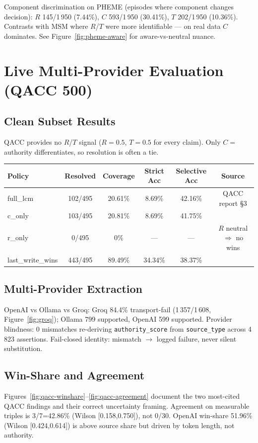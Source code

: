 \documentclass[12pt,a4paper]{article}
\begin{document}
Component discrimination on PHEME (episodes where component changes decision): $R$ 145/1\,950 (7.44\%), $C$ 593/1\,950 (30.41\%), $T$ 202/1\,950 (10.36\%). Contrasts with MSM where $R$/$T$ were more identifiable --- on real data $C$ dominates. See Figure~\ref{fig:pheme-aware} for aware-vs-neutral nuance.

\section{Live Multi-Provider Evaluation (QACC 500)}

\subsection{Clean Subset Results}
QACC provides no $R$/$T$ signal ($R=0.5$, $T=0.5$ for every claim). Only $C=$\,authority differentiates, so resolution is often a tie.

\begin{table}[H]
\centering\small
\begin{tabular}{lccccc}
\toprule
Policy & Resolved & Coverage & Strict Acc & Selective Acc & Source \\
\midrule
full\_lcm & 102/495 & 20.61\% & 8.69\% & 42.16\% & QACC report \S3 \\
c\_only & 103/495 & 20.81\% & 8.69\% & 41.75\% & \\
r\_only & 0/495 & 0\% & --- & --- & $R$ neutral $\Rightarrow$ no wins \\
last\_write\_wins & 443/495 & 89.49\% & 34.34\% & 38.37\% &  \\
\bottomrule
\end{tabular}
\end{table}

\subsection{Multi-Provider Extraction}
OpenAI vs Ollama vs Groq: Groq 84.4\% transport-fail (1\,357/1\,608, Figure~\ref{fig:groq}); Ollama 799 supported, OpenAI 599 supported. Provider blindness: 0 mismatches re-deriving \texttt{authority\_score} from \texttt{source\_type} across 4\,823 assertions. Fail-closed identity: mismatch $\to$ logged failure, never silent substitution.

\subsection{Win-Share and Agreement}
Figures~\ref{fig:qacc-winshare}--\ref{fig:qacc-agreement} document the two most-cited QACC findings and their correct uncertainty framing. Agreement on measurable triples is 3/7=42.86\% (Wilson [0.158,0.750]), not 0/30. OpenAI win-share 51.96\% (Wilson [0.424,0.614]) is above source share but driven by token length, not authority.
\end{document}
